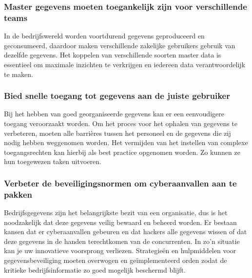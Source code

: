 \subsubsection{Master gegevens moeten toegankelijk zijn voor verschillende teams}
In de bedrijfswereld worden voortdurend gegevens geproduceerd en geconsumeerd, daardoor maken verschillende zakelijke gebruikers gebruik van dezelfde gegevens. Het koppelen van verschillende soorten master data is essentieel om maximale inzichten te verkrijgen en iedereen data verantwoordelijk te maken. 

\subsubsection{Bied snelle toegang tot gegevens aan de juiste gebruiker}
Bij het hebben van goed georganiseerde gegevens kan er een eenvoudigere toegang veroorzaakt worden. Om het proces voor het ophalen van gegevens te verbeteren, moeten alle barrières tussen het personeel en de gegevens die zij nodig hebben weggenomen worden. Het vermijden van het instellen van complexe toegangsrechten kan hierbij als best practice opgenomen worden. Zo kunnen ze hun toegewezen taken uitvoeren. 

\subsubsection{Verbeter de beveiligingsnormen om cyberaanvallen aan te pakken}
Bedrijfsgegevens zijn het belangrijkste bezit van een organisatie, dus is het noodzakelijk dat deze gegevens veilig bewaard en beheerd worden. Er bestaan kansen dat er cyberaanvallen gebeuren en dat hackers alle gegevens wissen of dat deze gegevens in de handen terechtkomen van de concurrenten. In zo’n situatie kan je uw innovatieve voorsprong verliezen. Strategieën en hulpmiddelen voor gegevensbeveiliging moeten overwogen en geïmplementeerd orden zodat de kritieke bedrijfsinformatie zo goed mogelijk beschermd blijft. 

